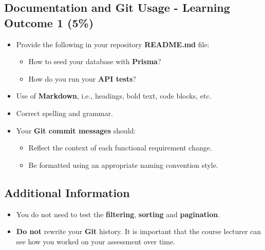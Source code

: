 \documentclass{article}
\begin{document}
\subsection*{Documentation and Git Usage - Learning Outcome 1 (5\%)}
\begin{itemize}
    \item Provide the following in your repository \textbf{README.md} file:
    \begin{itemize} 
      \item How to seed your database with \textbf{Prisma}?
      \item How do you run your \textbf{API tests}?
    \end{itemize}
    \item Use of \textbf{Markdown}, i.e., headings, bold text, code blocks, etc.
    \item Correct spelling and grammar.
    \item Your \textbf{Git commit messages} should:
    \begin{itemize}
      \item Reflect the context of each functional requirement change.
      \item Be formatted using an appropriate naming convention style.
    \end{itemize}	
\end{itemize} 
          
\subsection*{Additional Information}
\begin{itemize}
    \item You do not need to test the \textbf{filtering}, \textbf{sorting} and \textbf{pagination}.
    \item \textbf{Do not} rewrite your \textbf{Git} history. It is important that the course lecturer can see how you worked on your assessment over time. 
\end{itemize} 
\end{document}
